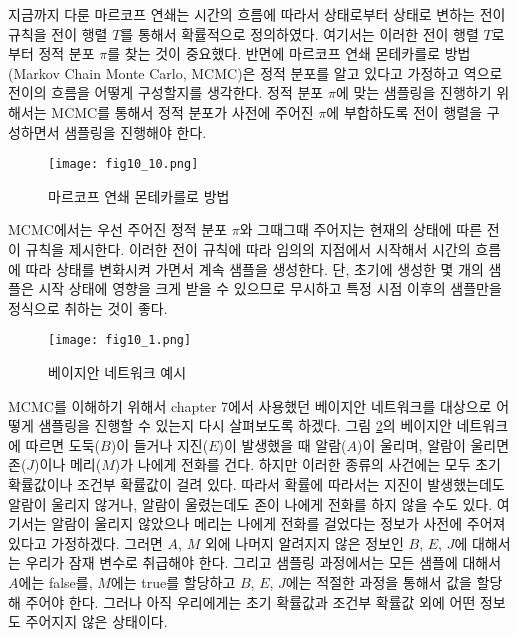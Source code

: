 \documentclass[a4paper]{oblivoir}
\begin{document}
지금까지 다룬 마르코프 연쇄는 시간의 흐름에 따라서 상태로부터 상태로 변하는 전이 규칙을 전이 행렬 $T$를 통해서 확률적으로 정의하였다. 여기서는 이러한 전이 행렬 $T$로부터 정적 분포 $\pi$를 찾는 것이 중요했다. 반면에 마르코프 연쇄 몬테카를로 방법(Markov Chain Monte Carlo, MCMC)은 정적 분포를 알고 있다고 가정하고 역으로 전이의 흐름을 어떻게 구성할지를 생각한다. 정적 분포 $\pi$에 맞는 샘플링을 진행하기 위해서는 MCMC를 통해서 정적 분포가 사전에 주어진 $\pi$에 부합하도록 전이 행렬을 구성하면서 샘플링을 진행해야 한다.  \\

\begin{figure}[ht] \centering 
\texttt{[image: fig10\_10.png]} 
\caption{마르코프 연쇄 몬테카를로 방법}
\label{fig:10-10}
\end{figure}  

MCMC에서는 우선 주어진 정적 분포 $\pi$와 그때그때 주어지는 현재의 상태에 따른 전이 규칙을 제시한다. 이러한 전이 규칙에 따라 임의의 지점에서 시작해서 시간의 흐름에 따라 상태를 변화시켜 가면서 계속 샘플을 생성한다. 단, 초기에 생성한 몇 개의 샘플은 시작 상태에 영향을 크게 받을 수 있으므로 무시하고 특정 시점 이후의 샘플만을 정식으로 취하는 것이 좋다. \\

\begin{figure}[ht] \centering 
\texttt{[image: fig10\_1.png]} 
\caption{베이지안 네트워크 예시}
\label{fig:10-12}
\end{figure}  

MCMC를 이해하기 위해서 chapter 7에서 사용했던 베이지안 네트워크를 대상으로 어떻게 샘플링을 진행할 수 있는지 다시 살펴보도록 하겠다. 그림 \ref{fig:10-12}의 베이지안 네트워크에 따르면 도둑($B$)이 들거나 지진($E$)이 발생했을 때 알람($A$)이 울리며, 알람이 울리면 존($J$)이나 메리($M$)가 나에게 전화를 건다. 하지만 이러한 종류의 사건에는 모두 초기 확률값이나 조건부 확률값이 걸려 있다. 따라서 확률에 따라서는 지진이 발생했는데도 알람이 울리지 않거나, 알람이 울렸는데도 존이 나에게 전화를 하지 않을 수도 있다. 여기서는 알람이 울리지 않았으나 메리는 나에게 전화를 걸었다는 정보가 사전에 주어져 있다고 가정하겠다. 그러면 $A$, $M$ 외에 나머지 알려지지 않은 정보인 $B$, $E$, $J$에 대해서는 우리가 잠재 변수로 취급해야 한다. 그리고 샘플링 과정에서는 모든 샘플에 대해서 $A$에는 false를, $M$에는 true를 할당하고 $B$, $E$, $J$에는 적절한 과정을 통해서 값을 할당해 주어야 한다. 그러나 아직 우리에게는 초기 확률값과 조건부 확률값 외에 어떤 정보도 주어지지 않은 상태이다. \\
\end{document}
